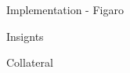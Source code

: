 \documentclass[11pt]{beamer}
\begin{document}
\begin{frame}{Implementation - Figaro}

\end{frame}

\begin{frame}{Insignts}

\end{frame}

\begin{frame}{Collateral}

\end{frame}
\end{document}
